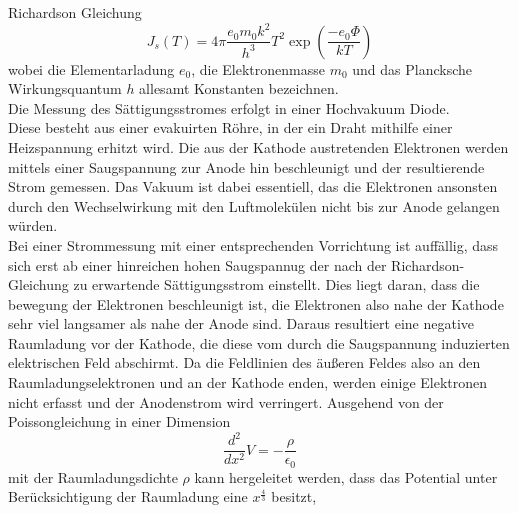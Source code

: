 Richardson Gleichung
\begin{equation}
    \label{eq:richardson}
J_s(T)=4\pi\frac{e_0m_0k^2}{h^3}T^2\exp(\frac{-e_0\Phi}{kT})
\end{equation}
wobei die Elementarladung $e_0$, die Elektronenmasse $m_0$ und das Plancksche Wirkungsquantum $h$ allesamt Konstanten bezeichnen. \\
Die Messung des Sättigungsstromes erfolgt in einer Hochvakuum Diode. \\ Diese besteht aus einer evakuirten Röhre, in der ein Draht mithilfe einer
Heizspannung erhitzt wird. Die aus der Kathode austretenden Elektronen werden mittels einer Saugspannung zur Anode hin beschleunigt
und der resultierende Strom gemessen. Das Vakuum ist dabei essentiell, das die Elektronen ansonsten durch den Wechselwirkung mit den Luftmolekülen nicht 
bis zur Anode gelangen würden. \\
Bei einer Strommessung mit einer entsprechenden Vorrichtung ist auffällig, dass sich erst ab einer hinreichen hohen Saugspannug 
der nach der Richardson-Gleichung zu erwartende Sättigungsstrom einstellt. Dies liegt daran, dass die bewegung der Elektronen beschleunigt ist,
die Elektronen also nahe der Kathode sehr viel langsamer als nahe der Anode sind. Daraus resultiert eine negative Raumladung vor der Kathode,
die diese vom durch die Saugspannung induzierten elektrischen Feld abschirmt. Da die Feldlinien des äußeren Feldes also an den Raumladungselektronen 
und an der Kathode enden, werden einige Elektronen nicht erfasst und der Anodenstrom wird verringert.
Ausgehend von der Poissongleichung in einer Dimension 
\begin{equation}
\frac{d^2}{dx^2}V=-\frac{\rho}{\epsilon_0}
\end{equation}
mit der Raumladungsdichte $\rho$ kann hergeleitet werden, dass das Potential unter Berücksichtigung der Raumladung eine $x^{\frac{4}{3}}$ besitzt, 

